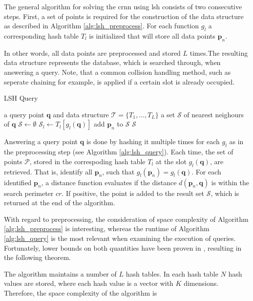 \documentclass[../../../main.tex]{subfiles}
\begin{document}
 The general algorithm for solving the \gls{crnn} using \gls{lsh} consists of two consecutive steps. First, a set of points is required for the construction of the data structure as described in Algorithm \ref{alg:lsh_preprocess}. For each function $g_l$ a corresponding hash table $T_l$ is initialized that will store all data points $\bm{p}_n$. 
 
 In other words, all data points are preprocessed and stored $L$ times.The resulting data structure represents the database, which is searched through, when answering a query. Note, that a common collision handling method, such as seperate chaining for example, is applied if a certain slot is already occupied.

 \begin{algorithm}
    \caption{LSH Query}
    \label{alg:lsh_query}
    \begin{algorithmic}[1]
        \REQUIRE a query point $\bm{q}$ and data structure $\mathcal{T} = \{T_1, \dots, T_L\}$
        \ENSURE a set $\mathcal{S}$ of nearest neighours of $\bm{q}$
        \STATE $\mathcal{S} \leftarrow \emptyset$
            \STATE $\mathcal{S}_l \leftarrow T_l[g_l(\bm{q})]$
                        \STATE add $\bm{p}_n$ to $\mathcal{S}$
                    \ENDIF
                \ENDFOR
            \ENDIF
        \ENDFOR
        \RETURN $\mathcal{S}$
    \end{algorithmic}
 \end{algorithm}

 Answering a query point $\bm{q}$ is done by hashing it multiple times for each $g_l$ as in the preprocessing step (see Algorithm \ref{alg:lsh_query}). Each time, the set of points $\mathcal{P}$, stored in the correspoding hash table $T_l$ at the slot $g_l(\bm{q})$, are retrieved. That is, identify all $\bm{p}_n$, such that $g_l(\bm{p}_n) = g_l(\bm{q})$. For each identified $\bm{p}_n$, a distance function evaluates if the distance $d(\bm{p}_n, \bm{q})$ is within the search perimeter $cr$. If positive, the point is added to the result set $\mathcal{S}$, which is returned at the end of the algorithm.

 With regard to preprocessing, the consideration of space complexity of Algorithm \ref{alg:lsh_preprocess} is interesting, whereas the runtime of Algorithm \ref{alg:lsh_query} is the most relevant when examining the execution of queries. Fortunately, lower bounds on both quantities have been proven in \cite{motwani2006lower}, resulting in the following theorem.


 The algorithm maintains a number of $L$ hash tables. In each hash table $N$ hash values are stored, where each hash value is a vector with $K$ dimensions. Therefore, the space complexity of the algorithm is 
\end{document}
